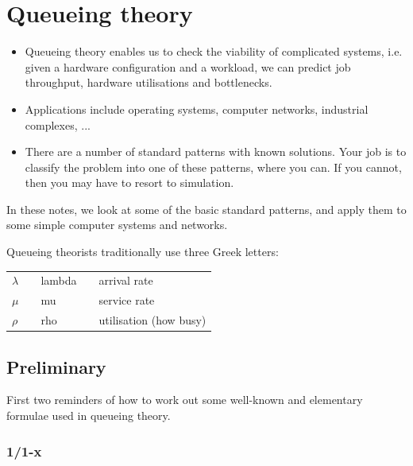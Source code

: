 \documentclass[12pt,fleqn]{report}
\begin{document}
\tableofcontents

\newpage


\chapter{Queueing theory}

\begin{itemize}

\item Queueing theory enables us to check the viability of
complicated systems, i.e. given a hardware configuration 
and a workload, we can predict job throughput, hardware 
utilisations and bottlenecks.

\item Applications include operating systems,
computer networks, industrial complexes, ...

\item There are a number of standard patterns with
known solutions. Your job is to classify the problem 
into one of these patterns, where you can.
If you cannot, then you may have to resort to simulation.

\end{itemize}

In these notes, we look at some of the basic
standard patterns, and apply them to some simple
computer systems and networks.


\noindent
Queueing theorists traditionally use three Greek letters:


\begin{center}
\begin{tabular}{l c l c l}
$\lambda$ && lambda && arrival rate \\[0.2in]
$\mu$     && mu     && service rate \\[0.2in]
$\rho$    && rho    && utilisation (how busy) \\[0.2in]
\end{tabular}
\end{center}


\section{Preliminary}
First two reminders of how to work out some well-known 
and elementary formulae used in queueing theory.

\subsection{1/1-x}
\end{document}

